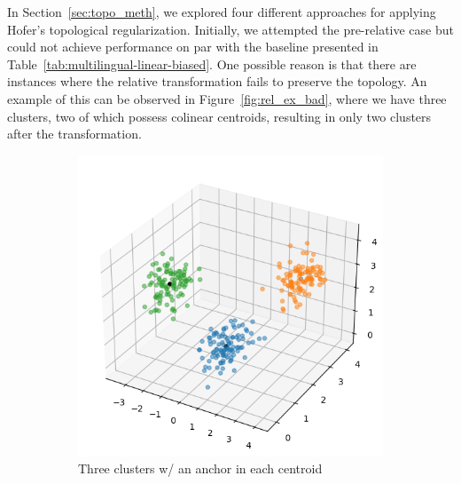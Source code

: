 \documentclass[../main.tex]{subfiles}
\begin{document}
In Section~\ref{sec:topo_meth}, we explored four different approaches for applying Hofer's topological regularization. Initially, we attempted the pre-relative case but could not achieve performance on par with the baseline presented in Table~\ref{tab:multilingual-linear-biased}. One possible reason is that there are instances where the relative transformation fails to preserve the topology. An example of this can be observed in Figure~\ref{fig:rel_ex_bad}, where we have three clusters, two of which possess colinear centroids, resulting in only two clusters after the transformation.\\


\begin{figure}[ht!]
     \centering
    \begin{subfigure}[b]{0.45\textwidth}
         \centering
         \includegraphics[width=\textwidth]{figures/rs/stitching/clusters_1.png}
        \caption{Three clusters w/ an anchor in each centroid}
         \label{fig:rel_ex_1}
     \end{subfigure}\hfill
      \begin{subfigure}[b]{0.45\textwidth}
         \centering

\end{subfigure}
\end{figure}
\end{document}
